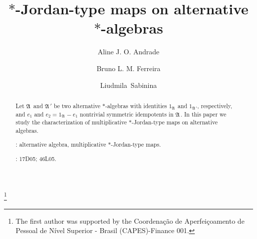 \documentclass{amsart}
\def\A{{\mathfrak A}\, }
\begin{document}
\title{$*$-Jordan-type maps on alternative $*$-algebras}

\thanks{The first author was supported by the Coordenação de Aperfeiçoamento de Pessoal de Nível Superior - Brasil (CAPES)-Finance 001.}

\author[Aline J. O. Andrade]{Aline J. O. Andrade}
\address{Aline Jaqueline de Oliveira Andrade, Federal University of ABC, 
dos Estados Avenue, 5001, 
09210-580, Santo Andr\'{e}, Brazil\\ 
{\em E-mail}: {\tt aline.jaqueline@ufabc.edu.br}}{}

 
\author[Bruno L. M. Ferreira]{Bruno L. M. Ferreira}
\address{Bruno Leonardo Macedo Ferreira, Federal University of Technology, 
Avenida Professora Laura Pacheco Bastos, 800, 
85053-510, Guarapuava, Brazil\\
{\em E-mail}: {\tt brunolmfalg@gmail.com}}{}


\author[Liudmila~Sabinina]{Liudmila~Sabinina}
\address{Liudmila~Sabinina, Autonomous University of the State of Morelos\\
Cuernavaca, Mexico.\\
{\em E-mail}: {\tt liudmila@uaem.mx}}{}

\begin{abstract}
Let $\A$ and $\A'$ be two alternative $*$-algebras with identities $1_{\A}$ and $1_{\A'}$, respectively, and $e_1$ and $e_2 = 1_{\A} - e_1$ nontrivial symmetric idempotents in $\A$. In this paper we study the characterization of multiplicative $*$-Jordan-type maps on alternative algebras. 

\vspace*{.1cm}

: alternative algebra, multiplicative $*$-Jordan-type maps.
\vspace*{.1cm}

:  17D05; 46L05.
\end{abstract}
\end{document}
